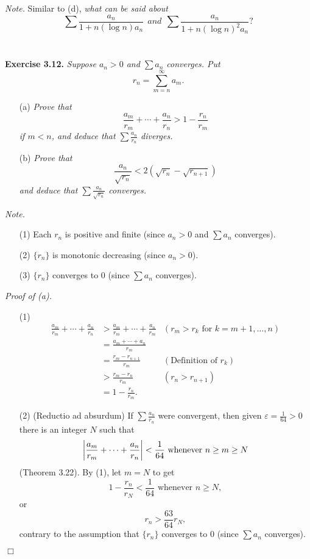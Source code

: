 \documentclass{article}
\begin{document}
\emph{Note.}
Similar to (d),
\emph{what can be said about
$$\sum \frac{a_n}{1+n(\log n) a_n} \:\: and \:\:
\sum \frac{a_n}{1+n(\log n)^2 a_n}?$$} \\\\






\textbf{Exercise 3.12.}
\emph{Suppose $a_n > 0$ and $\sum a_n$ converges.
Put
$$r_n = \sum_{m=n}^{\infty} a_m.$$}
\begin{enumerate}
\item[(a)]
\emph{Prove that
$$\frac{a_m}{r_m} + \cdots + \frac{a_n}{r_n} > 1 - \frac{r_n}{r_m}$$
if $m < n$, and deduce that $\sum \frac{a_n}{r_n}$ diverges.}
\item[(b)]
\emph{Prove that
$$\frac{a_n}{\sqrt{r_n}} < 2(\sqrt{r_n} - \sqrt{r_{n+1}})$$
and deduce that $\sum \frac{a_n}{\sqrt{r_n}}$ converges.} \\
\end{enumerate}

\emph{Note.}
\begin{enumerate}
\item[(1)]
Each $r_n$ is positive and finite (since $a_n > 0$ and $\sum a_n$ converges).
\item[(2)]
$\{r_n\}$ is monotonic decreasing (since $a_n > 0$).
\item[(3)]
$\{r_n\}$ converges to $0$ (since $\sum a_n$ converges). \\
\end{enumerate}

\emph{Proof of (a).}
\begin{enumerate}
\item[(1)]
\begin{align*}
  \frac{a_m}{r_m} + \cdots + \frac{a_n}{r_n}
  &> \frac{a_m}{r_m} + \cdots + \frac{a_n}{r_m}
    &(\text{$r_m > r_k$ for $k=m+1,\ldots,n$}) \\
  &= \frac{a_m + \cdots + a_n}{r_m} \\
  &= \frac{r_m - r_{n+1}}{r_m}
    &(\text{Definition of $r_k$}) \\
  &> \frac{r_m - r_{n}}{r_m}
    &(r_n > r_{n+1}) \\
  &= 1 - \frac{r_n}{r_m}.
\end{align*}
\item[(2)]
(Reductio ad absurdum)
If $\sum \frac{a_n}{r_n}$ were convergent,
then given $\varepsilon = \frac{1}{64} > 0$
there is an integer $N$ such that
$$\abs{\frac{a_m}{r_m} + \cdots + \frac{a_n}{r_n}} < \frac{1}{64}
\text{ whenever } n \geq m \geq N$$
(Theorem 3.22). By (1), let $m = N$ to get
$$1 - \frac{r_n}{r_N} < \frac{1}{64}
\text{ whenever } n \geq N,$$
or $$r_n > \frac{63}{64} r_N,$$
contrary to the assumption that
$\{r_n\}$ converges to $0$ (since $\sum a_n$ converges).
\end{enumerate}
$\Box$ \\
\end{document}
